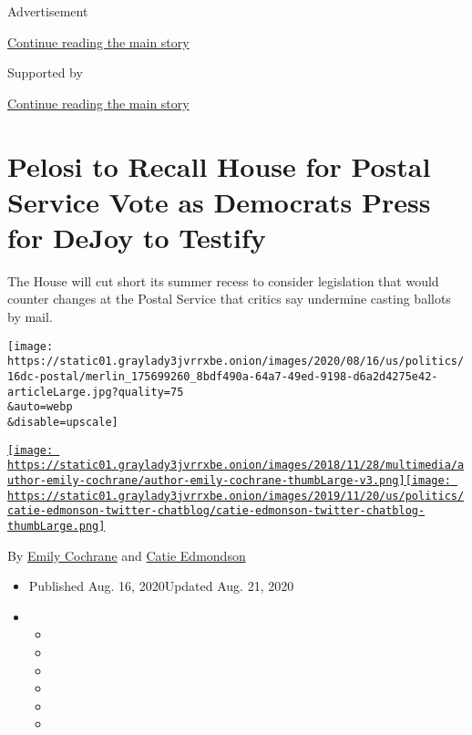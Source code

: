 Advertisement

\protect\hyperlink{after-top}{Continue reading the main story}

Supported by

\protect\hyperlink{after-sponsor}{Continue reading the main story}

\hypertarget{pelosi-to-recall-house-for-postal-service-vote-as-democrats-press-for-dejoy-to-testify}{%
\section{Pelosi to Recall House for Postal Service Vote as Democrats
Press for DeJoy to
Testify}\label{pelosi-to-recall-house-for-postal-service-vote-as-democrats-press-for-dejoy-to-testify}}

The House will cut short its summer recess to consider legislation that
would counter changes at the Postal Service that critics say undermine
casting ballots by mail.

\texttt{[image: https://static01.graylady3jvrrxbe.onion/images/2020/08/16/us/politics/16dc-postal/merlin\_175699260\_8bdf490a-64a7-49ed-9198-d6a2d4275e42-articleLarge.jpg?quality=75\\\&auto=webp\\\&disable=upscale]}

\href{https://www.nytimes3xbfgragh.onion/by/emily-cochrane}{\texttt{[image: https://static01.graylady3jvrrxbe.onion/images/2018/11/28/multimedia/author-emily-cochrane/author-emily-cochrane-thumbLarge-v3.png]}}\href{https://www.nytimes3xbfgragh.onion/by/catie-edmondson}{\texttt{[image: https://static01.graylady3jvrrxbe.onion/images/2019/11/20/us/politics/catie-edmonson-twitter-chatblog/catie-edmonson-twitter-chatblog-thumbLarge.png]}}

By \href{https://www.nytimes3xbfgragh.onion/by/emily-cochrane}{Emily
Cochrane} and
\href{https://www.nytimes3xbfgragh.onion/by/catie-edmondson}{Catie
Edmondson}

\begin{itemize}
\item
  Published Aug. 16, 2020Updated Aug. 21, 2020
\item
  \begin{itemize}
  \item
  \item
  \item
  \item
  \item
  \item
  \end{itemize}
\end{itemize}

